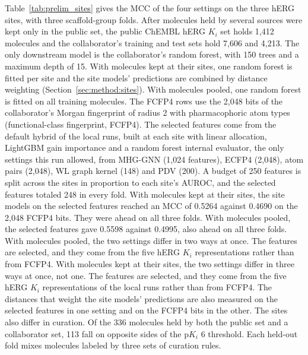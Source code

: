Table~\ref{tab:prelim_sites} gives the MCC of the four settings on the three hERG sites, with three scaffold-group folds. After molecules held by several sources were kept only in the public set, the public ChEMBL hERG $K_i$ set holds 1,412 molecules and the collaborator's training and test sets hold 7,606 and 4,213. The only downstream model is the collaborator's random forest, with 150 trees and a maximum depth of 15. With molecules kept at their sites, one random forest is fitted per site and the site models' predictions are combined by distance weighting (Section~\ref{sec:method:sites}). With molecules pooled, one random forest is fitted on all training molecules. The FCFP4 rows use the 2,048 bits of the collaborator's Morgan fingerprint of radius 2 with pharmacophoric atom types (functional-class fingerprint, FCFP4). The selected features come from the default hybrid of the local runs, built at each site with linear allocation, LightGBM gain importance and a random forest internal evaluator, the only settings this run allowed, from MHG-GNN (1,024 features), ECFP4 (2,048), atom pairs (2,048), WL graph kernel (148) and PDV (200). A budget of 250 features is split across the sites in proportion to each site's AUROC, and the selected features totaled 248 in every fold. With molecules kept at their sites, the site models on the selected features reached an MCC of 0.5264 against 0.4690 on the 2,048 FCFP4 bits. They were ahead on all three folds. With molecules pooled, the selected features gave 0.5598 against 0.4995, also ahead on all three folds. With molecules pooled, the two settings differ in two ways at once. The features are selected, and they come from the five hERG $K_i$ representations rather than from FCFP4. With molecules kept at their sites, the two settings differ in three ways at once, not one. The features are selected, and they come from the five hERG $K_i$ representations of the local runs rather than from FCFP4. The distances that weight the site models' predictions are also measured on the selected features in one setting and on the FCFP4 bits in the other. The sites also differ in curation. Of the 336 molecules held by both the public set and a collaborator set, 113 fall on opposite sides of the p$K_i$ 6 threshold. Each held-out fold mixes molecules labeled by three sets of curation rules.

